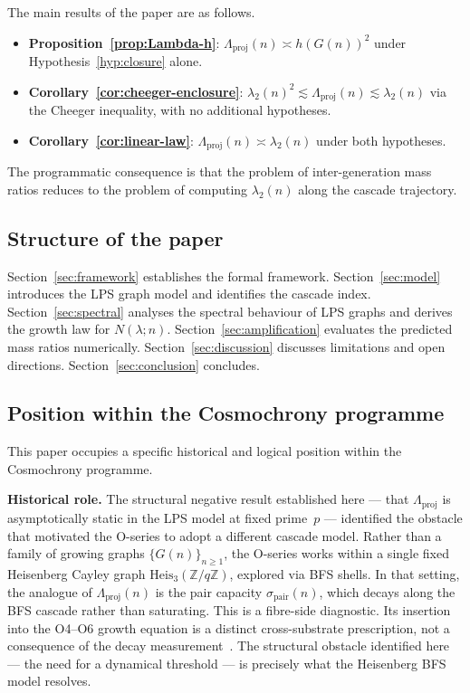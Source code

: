 \documentclass[12pt, a4paper]{article}
\theoremstyle{plain}
\theoremstyle{definition}
\theoremstyle{remark}
\begin{document}
      The main results of the paper are as follows.
      \begin{itemize}
        \item \textbf{Proposition~\ref{prop:Lambda-h}}:
        $\Lambda_{\mathrm{proj}}(n) \asymp h(G(n))^2$ under Hypothesis~\ref{hyp:closure}
        alone.
        \item \textbf{Corollary~\ref{cor:cheeger-enclosure}}:
        $\lambda_2(n)^2 \lesssim \Lambda_{\mathrm{proj}}(n) \lesssim \lambda_2(n)$
        via the Cheeger inequality, with no additional hypotheses.
        \item \textbf{Corollary~\ref{cor:linear-law}}:
        $\Lambda_{\mathrm{proj}}(n) \asymp \lambda_2(n)$ under both hypotheses.
      \end{itemize}
      The programmatic consequence is that the problem of inter-generation mass ratios
      reduces to the problem of computing $\lambda_2(n)$ along the cascade trajectory.

    \subsection{Structure of the paper}
      \label{sec:intro:structure}

      Section~\ref{sec:framework} establishes the formal framework.
      Section~\ref{sec:model} introduces the LPS graph model and identifies the
      cascade index.
      Section~\ref{sec:spectral} analyses the spectral behaviour of LPS graphs and
      derives the growth law for $N(\lambda; n)$.
      Section~\ref{sec:amplification} evaluates the predicted mass ratios numerically.
      Section~\ref{sec:discussion} discusses limitations and open directions.
      Section~\ref{sec:conclusion} concludes.

    \subsection{Position within the Cosmochrony programme}
      \label{sec:intro:position}

      This paper occupies a specific historical and logical position within the
      Cosmochrony programme.

      \medskip
      \noindent\textbf{Historical role.}
      The structural negative result established here --- that
      $\Lambda_{\mathrm{proj}}$ is asymptotically static in the LPS model at fixed
      prime~$p$ --- identified the obstacle that motivated the O-series to adopt a
      different cascade model.
      Rather than a family of growing graphs $\{G(n)\}_{n \geq 1}$, the O-series
      works within a single fixed Heisenberg Cayley graph
      $\mathrm{Heis}_3(\mathbb{Z}/q\mathbb{Z})$, explored via BFS shells.
      In that setting, the analogue of $\Lambda_{\mathrm{proj}}(n)$ is the pair
      capacity $\sigma_{\mathrm{pair}}(n)$, which decays along the BFS cascade rather
      than saturating.
      This is a fibre-side diagnostic.  Its insertion into the O4--O6 growth equation
      is a distinct cross-substrate prescription, not a consequence of the decay
      measurement~\cite{Beau2026sgn}.
      The structural obstacle identified here --- the need for a dynamical threshold
      --- is precisely what the Heisenberg BFS model resolves.
\end{document}
